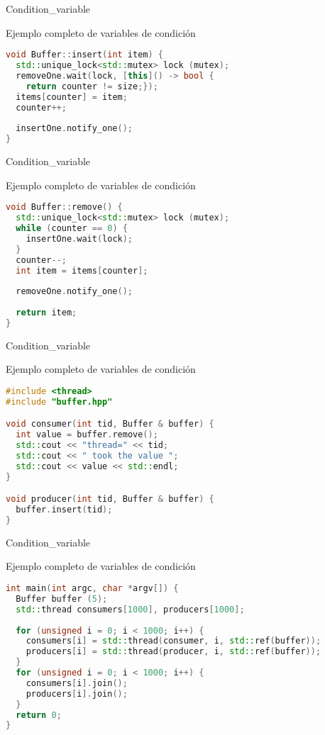 \begin{frame}[fragile]{Condition\_variable}
\begin{block}{Ejemplo completo de variables de condición}
\begin{lstlisting}[language=C++, basicstyle=\small]
void Buffer::insert(int item) {
  std::unique_lock<std::mutex> lock (mutex);
  removeOne.wait(lock, [this]() -> bool {
    return counter != size;});
  items[counter] = item;
  counter++;
  
  insertOne.notify_one();
}
\end{lstlisting}
\end{block}
\end{frame}

\begin{frame}[fragile]{Condition\_variable}
\begin{block}{Ejemplo completo de variables de condición}
\begin{lstlisting}[language=C++, basicstyle=\small]
void Buffer::remove() {
  std::unique_lock<std::mutex> lock (mutex);
  while (counter == 0) {
    insertOne.wait(lock);
  }
  counter--;
  int item = items[counter];
  
  removeOne.notify_one();
  
  return item;
}
\end{lstlisting}
\end{block}
\end{frame}

\begin{frame}[fragile]{Condition\_variable}
\begin{block}{Ejemplo completo de variables de condición}
\begin{lstlisting}[language=C++, basicstyle=\small]
#include <thread>
#include "buffer.hpp"

void consumer(int tid, Buffer & buffer) {
  int value = buffer.remove();
  std::cout << "thread=" << tid;
  std::cout << " took the value ";
  std::cout << value << std::endl;
}

void producer(int tid, Buffer & buffer) {
  buffer.insert(tid);
}
\end{lstlisting}
\end{block}
\end{frame}

\begin{frame}[fragile]{Condition\_variable}
\begin{block}{Ejemplo completo de variables de condición}
\begin{lstlisting}[language=C++, basicstyle=\small]
int main(int argc, char *argv[]) {
  Buffer buffer (5);
  std::thread consumers[1000], producers[1000];
  
  for (unsigned i = 0; i < 1000; i++) {
    consumers[i] = std::thread(consumer, i, std::ref(buffer));
    producers[i] = std::thread(producer, i, std::ref(buffer));
  }
  for (unsigned i = 0; i < 1000; i++) {
    consumers[i].join();
    producers[i].join();
  }
  return 0;
}
\end{lstlisting}
\end{block}
\end{frame}